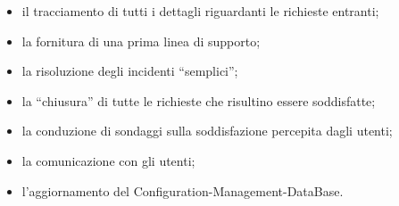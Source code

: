 \begin{itemize}
\item{il tracciamento di tutti i dettagli riguardanti le richieste entranti;}
\item{la fornitura di una prima linea di supporto;}
\item{la risoluzione degli incidenti ``semplici'';}
\item{la ``chiusura'' di tutte le richieste che risultino essere soddisfatte;}
\item{la conduzione di sondaggi sulla soddisfazione percepita dagli utenti;}
\item{la comunicazione con gli utenti;}
\item{l'aggiornamento del \acf{Configuration-Management-DataBase}.}
\end{itemize}